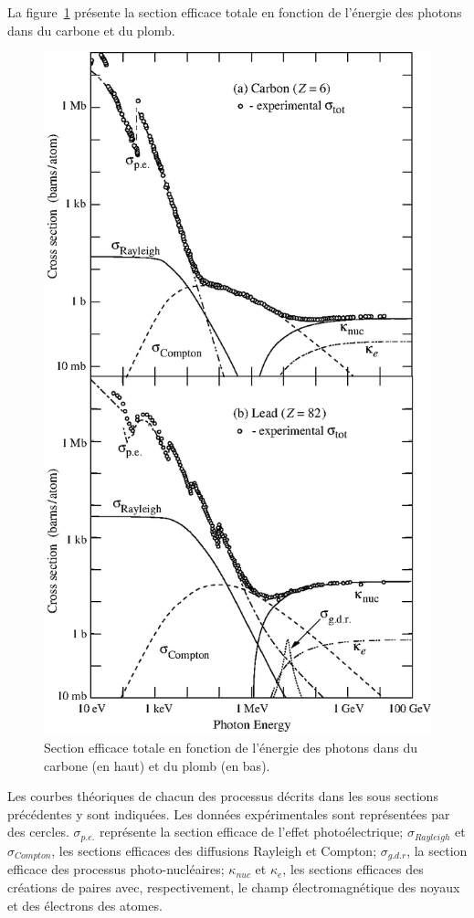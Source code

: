 La figure~\ref{fig:photon_in_matter} présente la section efficace totale en fonction de l'énergie des photons dans du carbone et du plomb. 
\begin{figure}[!h]
  \begin{center}
    \includegraphics[width=.6\textwidth]{ShowerTh/figs/sigma_both_06.eps}
    \caption{Section efficace totale en fonction de l'énergie des photons dans du carbone (en haut) et du plomb (en bas).}
    \label{fig:photon_in_matter}
  \end{center}
\end{figure}
Les courbes théoriques de chacun des processus décrits dans les sous sections précédentes y sont indiquées. Les données expérimentales sont représentées par des cercles. $\sigma_{p.e.}$ représente la section efficace de l'effet photoélectrique; $\sigma_{Rayleigh}$ et $\sigma_{Compton}$, les sections efficaces des diffusions Rayleigh et Compton; $\sigma_{g.d.r}$, la section efficace des processus photo-nucléaires; $\kappa_{nuc}$ et $\kappa_e$, les sections efficaces des créations de paires avec, respectivement, le champ électromagnétique des noyaux et des électrons des atomes.

